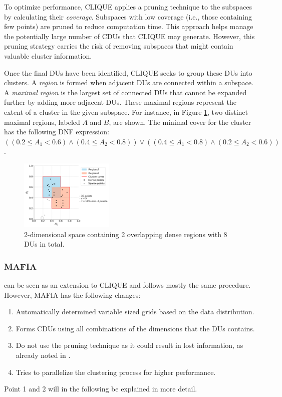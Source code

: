 To optimize performance, CLIQUE applies a pruning technique to the subspaces by calculating their \textit{coverage}. Subspaces with low coverage (i.e., those containing few points) are pruned to reduce computation time. This approach helps manage the potentially large number of CDUs that CLIQUE may generate. However, this pruning strategy carries the risk of removing subspaces that might contain valuable cluster information.

Once the final DUs have been identified, CLIQUE seeks to group these DUs into clusters. A \textit{region} is formed when adjacent DUs are connected within a subspace. A \textit{maximal region} is the largest set of connected DUs that cannot be expanded further by adding more adjacent DUs. These maximal regions represent the extent of a cluster in the given subspace. For instance, in Figure \ref{fig:dense_cells_and_regions}, two distinct maximal regions, labeled $A$ and $B$, are shown. The minimal cover for the cluster has the following DNF expression: $((0.2 \leq A_1 < 0.6) \land (0.4 \leq A_2 < 0.8)) \lor ((0.4 \leq A_1 < 0.8) \land (0.2 \leq A_2 < 0.6))$.
\begin{figure}[H]
    \vspace*{-0.7cm}
    \centering
    \includegraphics[width=0.4\textwidth]{figures/dense_cells_and_regions.png}
    \caption{2-dimensional space containing 2 overlapping dense regions with 8 DUs in total.}
    \label{fig:dense_cells_and_regions}
    \vspace*{-0.7cm}
\end{figure}

\subsubsection{MAFIA}
can be seen as an extension to CLIQUE and follows mostly the same procedure. However, MAFIA has the following changes:
\begin{enumerate}
    \item Automatically determined variable sized grids based on the data distribution.
    \item Forms CDUs using all combinations of the dimensions that the DUs contains.
    \item Do not use the pruning technique as it could result in lost information, as already noted in \cite{clique}.
    \item Tries to parallelize the clustering process for higher performance.
\end{enumerate}
Point 1 and 2 will in the following be explained in more detail.

